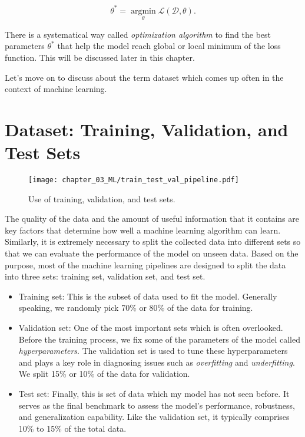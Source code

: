 \begin{equation}
    \theta^* = \operatorname*{argmin}_\theta \mathcal{L}(\mathcal{D}, \theta).
    \label{eq:argmin_loss}
\end{equation}

There is a systematical way called \textit{optimization algorithm} to find the best parameters $\theta^*$ that help the model reach global or local minimum of the loss function. This will be discussed later in this chapter. 

Let's move on to discuss about the term dataset which comes up often in the context of machine learning.

\section{Dataset: Training, Validation, and Test Sets}

\begin{figure}[t]
    \centering
    \texttt{[image: chapter\_03\_ML/train\_test\_val\_pipeline.pdf]}
    \caption{Use of training, validation, and test sets.}
    \label{fig:dataset_split}
\end{figure}

The quality of the data and the amount of useful information that it contains are key factors that determine how well a machine learning algorithm can learn. Similarly, it is extremely necessary to split the collected data into different sets so that we can evaluate the performance of the model on unseen data. Based on the purpose, most of the machine learning pipelines are designed to split the data into three sets: training set, validation set, and test set.

\begin{itemize}
    \item Training set: This is the subset of data used to fit the model. Generally speaking, we randomly pick 70\% or 80\% of the data for training.
    \item Validation set: One of the most important sets which is often overlooked. Before the training process, we fix some of the parameters of the model called \textit{hyperparameters}. The validation set is used to tune these hyperparameters and plays a key role in diagnosing issues such as \textit{overfitting} and \textit{underfitting}. We split 15\% or 10\% of the data for validation.
    \item Test set: Finally, this is set of data which my model has not seen before. It serves as the final benchmark to assess the model’s performance, robustness, and generalization capability. Like the validation set, it typically comprises 10\% to 15\% of the total data. 
\end{itemize}

